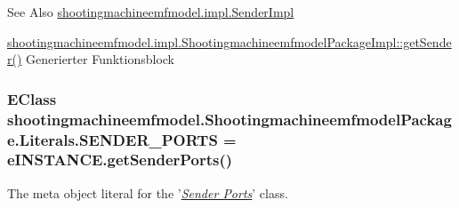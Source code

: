 \begin{DoxySeeAlso}{See Also}
\hyperlink{classshootingmachineemfmodel_1_1impl_1_1_sender_impl}{shootingmachineemfmodel.\-impl.\-Sender\-Impl} 

\hyperlink{classshootingmachineemfmodel_1_1impl_1_1_shootingmachineemfmodel_package_impl_ae9d64d90ba3a6d16470ba73e5abc0808}{shootingmachineemfmodel.\-impl.\-Shootingmachineemfmodel\-Package\-Impl\-::get\-Sender()} Generierter Funktionsblock 
\end{DoxySeeAlso}
\hypertarget{interfaceshootingmachineemfmodel_1_1_shootingmachineemfmodel_package_1_1_literals_a27631e3b6ae881f7793efd141acfd678}{
\subsubsection[{S\-E\-N\-D\-E\-R\-\_\-\-P\-O\-R\-T\-S}]{\setlength{\rightskip}{0pt plus 5cm}E\-Class shootingmachineemfmodel.\-Shootingmachineemfmodel\-Package.\-Literals.\-S\-E\-N\-D\-E\-R\-\_\-\-P\-O\-R\-T\-S = e\-I\-N\-S\-T\-A\-N\-C\-E.\-get\-Sender\-Ports()}}\label{interfaceshootingmachineemfmodel_1_1_shootingmachineemfmodel_package_1_1_literals_a27631e3b6ae881f7793efd141acfd678}
The meta object literal for the '\hyperlink{classshootingmachineemfmodel_1_1impl_1_1_sender_ports_impl}{{\itshape Sender Ports}}' class.

